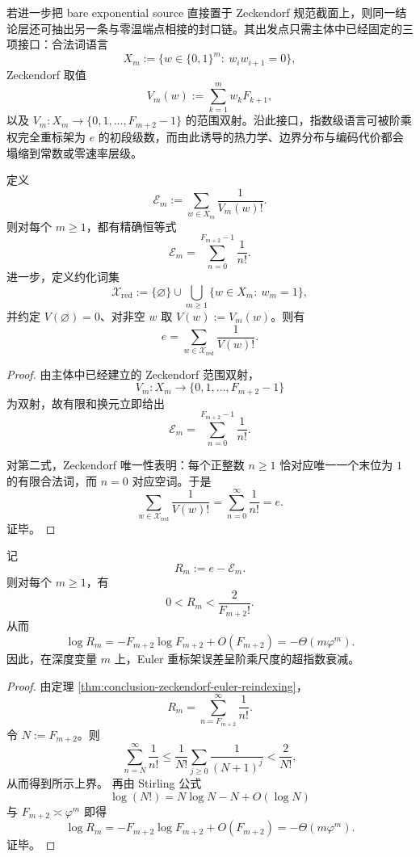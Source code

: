 若进一步把 bare exponential source 直接置于 Zeckendorf 规范截面上，则同一结论层还可抽出另一条与零温端点相接的封口链。其出发点只需主体中已经固定的三项接口：合法词语言
\[
X_m:=\{w\in\{0,1\}^m:\ w_iw_{i+1}=0\},
\]
Zeckendorf 取值
\[
V_m(w):=\sum_{k=1}^{m}w_kF_{k+1},
\]
以及 \(V_m:X_m\to\{0,1,\dots,F_{m+2}-1\}\) 的范围双射。沿此接口，指数级语言可被阶乘权完全重标架为 \(e\) 的初段级数，而由此诱导的热力学、边界分布与编码代价都会塌缩到常数或零速率层级。

\begin{theorem}\label{thm:conclusion-zeckendorf-euler-reindexing}
定义
\[
\mathcal E_m:=\sum_{w\in X_m}\frac{1}{V_m(w)!}.
\]
则对每个 \(m\ge 1\)，都有精确恒等式
\[
\mathcal E_m=\sum_{n=0}^{F_{m+2}-1}\frac{1}{n!}.
\]
进一步，定义约化词集
\[
\mathcal X_{\mathrm{red}}
:=
\{\varnothing\}
\cup
\bigcup_{m\ge 1}\{w\in X_m:\ w_m=1\},
\]
并约定 \(V(\varnothing)=0\)、对非空 \(w\) 取 \(V(w):=V_m(w)\)。则有
\[
e=\sum_{w\in\mathcal X_{\mathrm{red}}}\frac{1}{V(w)!}.
\]
\end{theorem}
\begin{proof}
由主体中已经建立的 Zeckendorf 范围双射，
\[
V_m:X_m\longrightarrow\{0,1,\dots,F_{m+2}-1\}
\]
为双射，故有限和换元立即给出
\[
\mathcal E_m=\sum_{n=0}^{F_{m+2}-1}\frac{1}{n!}.
\]

对第二式，Zeckendorf 唯一性表明：每个正整数 \(n\ge 1\) 恰对应唯一一个末位为 \(1\) 的有限合法词，而 \(n=0\) 对应空词。于是
\[
\sum_{w\in\mathcal X_{\mathrm{red}}}\frac{1}{V(w)!}
=
\sum_{n=0}^{\infty}\frac{1}{n!}
=
e.
\]
证毕。
\end{proof}

\begin{corollary}\label{cor:conclusion-zeckendorf-euler-superexponential-tail}
记
\[
R_m:=e-\mathcal E_m.
\]
则对每个 \(m\ge 1\)，有
\[
0<R_m<\frac{2}{F_{m+2}!}.
\]
从而
\[
\log R_m=-F_{m+2}\log F_{m+2}+O(F_{m+2})=-\Theta(m\varphi^m).
\]
因此，在深度变量 \(m\) 上，Euler 重标架误差呈阶乘尺度的超指数衰减。
\end{corollary}
\begin{proof}
由定理 \ref{thm:conclusion-zeckendorf-euler-reindexing}，
\[
R_m=\sum_{n=F_{m+2}}^\infty \frac{1}{n!}.
\]
令 \(N:=F_{m+2}\)。则
\[
\sum_{n=N}^{\infty}\frac{1}{n!}
\le
\frac{1}{N!}\sum_{j\ge 0}\frac{1}{(N+1)^j}
<
\frac{2}{N!},
\]
从而得到所示上界。
再由 Stirling 公式
\[
\log(N!)=N\log N-N+O(\log N)
\]
与 \(F_{m+2}\asymp \varphi^m\) 即得
\[
\log R_m=-F_{m+2}\log F_{m+2}+O(F_{m+2})=-\Theta(m\varphi^m).
\]
证毕。
\end{proof}

